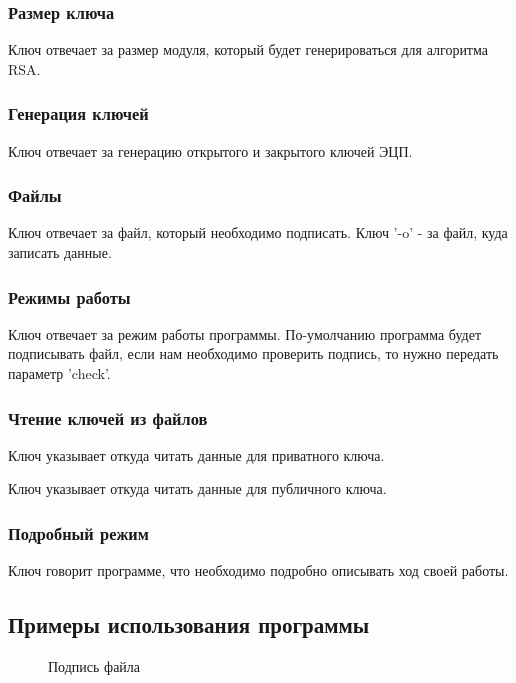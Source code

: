 \subsubsection{Размер ключа}
Ключ  отвечает за размер модуля, который будет генерироваться для алгоритма RSA.

\subsubsection{Генерация ключей}
Ключ  отвечает за генерацию открытого и закрытого ключей ЭЦП.

\subsubsection{Файлы}
Ключ  отвечает за файл, который необходимо подписать. Ключ '-o' - за файл, куда записать данные.

\subsubsection{Режимы работы}
Ключ  отвечает за режим работы программы. По-умолчанию программа будет подписывать файл, если нам необходимо проверить подпись, то нужно передать параметр 'check'.

\subsubsection{Чтение ключей из файлов}
Ключ  указывает откуда читать данные для приватного ключа.

Ключ  указывает откуда читать данные для публичного ключа.

\subsubsection{Подробный режим}
Ключ  говорит программе, что необходимо подробно описывать ход своей работы.

\newpage
\subsection{Примеры использования программы}

\begin{figure}[h!]
  \caption{Подпись файла}
\end{figure}

